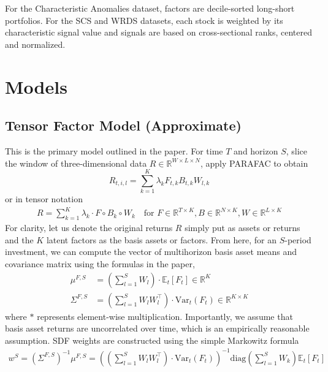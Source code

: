 \documentclass{article}
\newcommand{\E}{{\mathbb E}}
\newcommand{\R}{{\mathbb R}}
\begin{document}
For the Characteristic Anomalies dataset, factors are decile-sorted long-short portfolios. For the SCS and WRDS datasets, 
each stock is weighted by its characteristic signal value
and signals are based on cross-sectional ranks, centered and normalized. 


\section{Models}

\subsection{Tensor Factor Model (Approximate)} \label{approx}

This is the primary model outlined in the paper. For time $T$ and horizon $S$, slice the window of three-dimensional data $R \in \R^{W \times L \times N}$, apply PARAFAC to obtain 
\[R_{t, i, l} = \sum_{k=1}^K \lambda_k F_{t, k} B_{t, k} W_{l, k}\]
or in tensor notation
\begin{align}
    R = \sum_{k=1}^K \lambda_k \cdot F \circ B_k \circ W_k \ \ \ \text{ for } F \in \R^{T \times K}, B \in \R^{N \times K}, W \in \R^{L \times K} \label{parafac}
\end{align}
For clarity, let us denote the original returns $R$ simply put as assets or returns and the $K$ latent factors as the basis assets or factors. From here, for an $S$-period investment, 
we can compute the vector of multihorizon basis asset means and covariance matrix using the formulas in the paper, 
\begin{align}
    \mu^{F, S} &= \left( \sum_{l=1}^S W_l \right) \cdot \E_t [F_t] \in \mathbb{R}^K \\
    \Sigma^{F, S} &= \left( \sum_{l=1}^S W_l W_l^\top\right) \cdot \text{Var}_t(F_t) \in \mathbb{R}^{K \times K} \label{cov}
\end{align}
where $*$ represents element-wise multiplication. Importantly, we assume that basis asset returns are uncorrelated over time, which is an 
empirically reasonable assumption. SDF weights are constructed using the simple Markowitz formula
\begin{align}
    w^S = \left(\Sigma^{F, S} \right)^{-1} \mu^{F, S} = \left( \left( \sum_{l=1}^S W_l W_l^\top\right) \cdot \text{Var}_t(F_t) \right)^{-1} \text{diag}\left(\sum_{l=1}^S W_k \right) \mathbb{E}_t [F_t]
\end{align}
\end{document}
